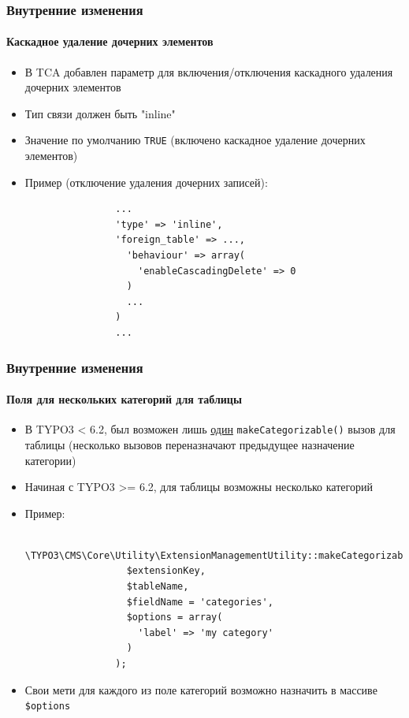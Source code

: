 
\begin{frame}[fragile]
	\frametitle{Внутренние изменения}
	\framesubtitle{Каскадное удаление дочерних элементов}

	\begin{itemize}
		\item В TCA добавлен параметр для включения/отключения каскадного удаления дочерних элементов
		\item Тип связи должен быть "inline"
		\item Значение по умолчанию \texttt{TRUE} (включено каскадное удаление дочерних элементов)
		\item Пример (отключение удаления дочерних записей):

			\begin{lstlisting}
				...
				'type' => 'inline',
				'foreign_table' => ...,
				  'behaviour' => array(
				    'enableCascadingDelete' => 0
				  )
				  ...
				)
				...
			\end{lstlisting}

	\end{itemize}

\end{frame}


\begin{frame}[fragile]
	\frametitle{Внутренние изменения}
	\framesubtitle{Поля для нескольких категорий для таблицы}

	\begin{itemize}
		\item В TYPO3 < 6.2, был возможен лишь \underline{один} \texttt{makeCategorizable()} вызов для таблицы
			(несколько вызовов переназначают предыдущее назначение категории)
		\item Начиная с TYPO3 >= 6.2, для таблицы возможны несколько категорий
		\item Пример:

			\begin{lstlisting}
				\TYPO3\CMS\Core\Utility\ExtensionManagementUtility::makeCategorizable(
				  $extensionKey,
				  $tableName,
				  $fieldName = 'categories',
				  $options = array(
				  	'label' => 'my category'
				  )
				);
			\end{lstlisting}

		\item Свои мети для каждого из поле категорий возможно назначить в массиве 
		\texttt{\$options}

	\end{itemize}

\end{frame}

